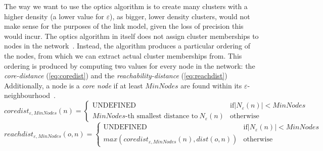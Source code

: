 The way we want to use the \gls{optics} algorithm is to create many clusters with a higher density (a lower value for $\varepsilon$), as bigger, lower density clusters, would not make sense for the purposes of the link model, given the loss of precision this would incur. The \gls{optics} algorithm in itself does not assign cluster memberships to nodes in the network~\cite[p.~52]{Ankerst:1999:OOP:304182.304187}. Instead, the algorithm produces a particular ordering of the nodes, from which we can extract actual cluster memberships from. This ordering is produced by computing two values for every node in the network: the \textit{core-distance} (\autoref{eq:coredist}) and the \textit{reachability-distance} (\autoref{eq:reachdist}) Additionally, a node is a \textit{core node} if at least $MinNodes$ are found within its $\varepsilon$-neighbourhood~\cite[p.~52]{Ankerst:1999:OOP:304182.304187}.
\begin{equation}\label{eq:coredist}
    coredist_{\varepsilon,MinNodes}(n) =
    \begin{cases}
        \text{UNDEFINED}                                          & \text{if} |N_\varepsilon(n)| < MinNodes \\
        MinNodes\text{-th smallest distance to}\ N_\varepsilon(n) & \text{otherwise}
    \end{cases}
\end{equation}
\begin{equation}\label{eq:reachdist}
    reachdist_{\varepsilon,MinNodes}(o, n) =
    \begin{cases}
        \text{UNDEFINED}                                    & \text{if} |N_\varepsilon(n)| < MinNodes \\
        max(coredist_{\varepsilon,MinNodes}(n), dist(o, n)) & \text{otherwise}
    \end{cases}
\end{equation}


